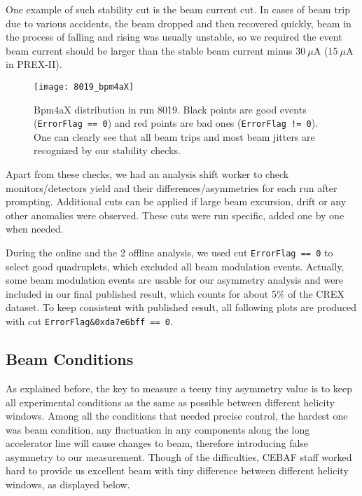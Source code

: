 One example of such stability cut is the beam current cut. In cases of beam trip
due to various accidents, the beam dropped and then recovered quickly, beam in
the process of falling and rising was usually unstable, so we required the event
beam current should be larger than the stable beam current minus $30\ \mu$A ($15\ \mu$A in PREX-II).

\begin{figure}[!h]
    \centering
    \texttt{[image: 8019\_bpm4aX]}
    \caption{Bpm4aX distribution in run 8019. Black points are good
    events (\texttt{ErrorFlag == 0}) and red points are bad ones (\texttt{ErrorFlag != 0}). 
    One can clearly see that all beam trips and most beam jitters are recognized 
    by our stability checks.}
\end{figure}

Apart from these checks, we had an analysis shift worker to check monitors/detectors 
yield and their differences/asymmetries for each run after prompting. Additional
cuts can be applied if large beam excursion, drift or any other anomalies were observed. 
These cuts were run specific, added one by one when needed.

During the online and the 2 offline analysis, we used cut \verb|ErrorFlag == 0|
to select good quadruplets, which excluded all beam modulation events. Actually, 
some beam modulation events are usable for our asymmetry analysis and were 
included in our final published result, which counts for about 5\% of the CREX dataset.
To keep consistent with published result, all following plots are produced with cut 
\verb|ErrorFlag&0xda7e6bff == 0|. 

\subsection{Beam Conditions}
As explained before, the key to measure a teeny tiny asymmetry value is to 
keep all experimental conditions as the same as possible between different 
helicity windows. Among all the conditions that needed precise control, the 
hardest one was beam condition, any fluctuation in any components along the 
long accelerator line will cause changes to beam, therefore introducing false 
asymmetry to our measurement. Though of the difficulties, CEBAF staff worked 
hard to provide us excellent beam with tiny difference between different helicity 
windows, as displayed below.

